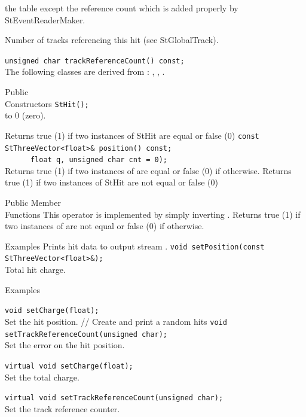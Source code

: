 \begin{Entry}
    the  table except the reference count which
    is added properly by StEventReaderMaker.
    
    Number of tracks referencing this hit (see StGlobalTrack).
    
    \verb+unsigned char trackReferenceCount() const;+\\    

    
    The following classes are derived from :
    , , .
    
    
\item[Public\\ Constructors]
    \verb+StHit();+\\
    
    to 0 (zero).

    Returns true (1) if two instances of StHit are equal or false (0)
    \verb+const StThreeVector<float>& position() const;+\\
    \verb+      float q, unsigned char cnt = 0);+\\
    Returns true (1) if two instances of  are equal or false (0)
    if otherwise.
    Returns true (1) if two instances of StHit are not equal or false (0)
\item[Public Member\\ Functions]
    This operator is implemented by simply inverting .
    Returns true (1) if two instances of  are not equal or false (0)
    if otherwise. 
\item[Examples]
    Prints hit data to output stream .
    \verb+void setPosition(const StThreeVector<float>&);+\\
    Total hit charge.

    
\item[Examples] 

    \verb+void setCharge(float);+\\
    Set the hit position.
//  Create and print a random hits 
    \verb+void setTrackReferenceCount(unsigned char);+\\
    Set the error on the hit position.

    \verb+virtual void setCharge(float);+\\
    Set the total charge.

    \verb+virtual void setTrackReferenceCount(unsigned char);+\\
    Set the track reference counter.
    

\end{Entry}
